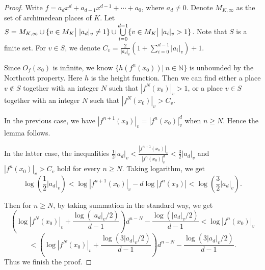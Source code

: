 \documentclass[10pt,a4paper]{amsart}
\begin{document}
\begin{proof}
    Write $f = a_d x^d + a_{d-1} x^{d-1} + \cdots + a_0$, where $a_d \neq 0$. Denote $M_{K,\infty}$ as the set of archimedean places of $K$. Let $S = M_{K,\infty}\cup\{ v\in M_K \big{|}\ |a_d|_v \neq 1\}\cup\bigcup\limits_{i=0}^{d-1}\{ v\in M_K \big{|}\ |a_i|_v > 1\}$. Note that $S$ is a finite set. For $v\in S$, we denote $C_v=\frac{2}{|a_d|_v}(1+\sum\limits_{i=0}^{d-1}|a_i|_v)+1$.
    
    Since $O_f(x_0)$ is infinite, we know $\{h(f^n(x_0)) |\ n\in \mathbb{N}\}$ is unbounded by the Northcott property. Here $h$ is the height function. Then we can find either a place $v\notin S$ together with an integer $N$ such that $|f^N(x_0)|_v > 1$, or a place $v\in S$ together with an integer $N$ such that $|f^N(x_0)|_v > C_v$.
    
    In the previous case, we have $|f^{n+1}(x_0)|_v = |f^n(x_0)|_v^d$ when $n\geq N$. Hence the lemma follows.
    
    In the latter case, the inequalities $\frac{1}{2} |a_d|_v < \frac{|f^{n+1}(x_0)|_v}{|f^n(x_0)|_v^d} < \frac{3}{2} |a_d|_v$ and $|f^n(x_0)|_v>C_v$ hold for every $n\geq N$. Taking logarithm, we get
    $$ \log(\frac{1}{2}|a_d|_v) < \log |f^{n+1}(x_0)|_v - d\log|f^n(x_0)| < \log(\frac{3}{2}|a_d|_v).$$
    
    Then for $n\geq N$, by taking summation in the standard way, we get $$(\log|f^N(x_0)|_v+\frac{\log(|a_d|_v/2)}{d-1})d^{n-N} - \frac{\log(|a_d|_v/2)}{d-1} < \log |f^n(x_0)|_v$$
    $$< (\log|f^N(x_0)|_v+\frac{\log(3|a_d|_v/2)}{d-1})d^{n-N} - \frac{\log(3|a_d|_v/2)}{d-1}.$$
    Thus we finish the proof.
\end{proof}
\end{document}
